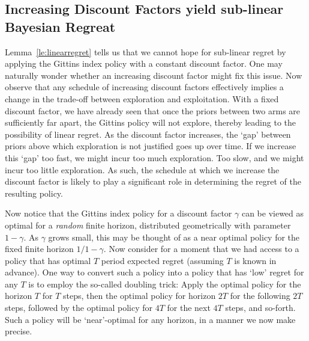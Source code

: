\subsection{Increasing Discount Factors yield sub-linear Bayesian Regreat}

Lemma~\ref{le:linearregret} tells us that we cannot hope for sub-linear regret by applying the Gittins index policy with a constant discount factor. One may naturally wonder whether an increasing discount factor might fix this issue. Now observe that any schedule of increasing discount factors effectively implies a change in the trade-off between exploration and exploitation. With a fixed discount factor, we have already seen that once the priors between two arms are sufficiently far apart, the Gittins policy will not explore, thereby leading to the possibility of linear regret. As the discount factor increases, the `gap' between priors above which exploration is not justified goes up over time. If we increase this `gap' too fast, we might incur too much exploration. Too slow, and we might incur too little exploration. As such, the schedule at which we increase the discount factor is likely to play a significant role in determining the regret of the resulting policy. 

Now notice that the Gittins index policy for a discount factor $\gamma$ can be viewed as optimal for a {\em random} finite horizon, distributed geometrically with parameter $1-\gamma$. As $\gamma$ grows small, this may be thought of as a near optimal policy for the fixed finite horizon $1/1-\gamma$. Now consider for a moment that we had access to a policy that has optimal $T$ period expected regret (assuming $T$ is known in advance). One way to convert such a policy into a policy that has `low' regret for any $T$ is to employ the so-called doubling trick: Apply the optimal policy for the horizon $T$ for $T$ steps, then the optimal policy for horizon $2T$ for the following $2T$ steps, followed by the optimal policy for $4T$ for the next $4T$ steps, and so-forth. Such a policy will be `near'-optimal for any horizon, in a manner we now make precise. 


